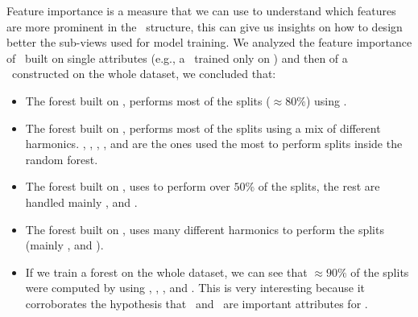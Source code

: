 Feature importance is a measure that we can use to understand which features are more prominent in
the \rf\ structure, this can give us insights on how to design better the sub-views used for model
training. We analyzed the feature importance of \rfs\ built on single attributes (e.g., a \rf\
trained only on \an) and then of a \rf\ constructed on the whole dataset, we concluded that:
\begin{itemize}
	\item The forest built on \an, performs most of the splits ($\approx 80\%$) using \an[2].
	\item The forest built on \bn, performs most of the splits using a mix of different
	      harmonics. \bn[6], \bn[9], \bn[3], \bn[14], \bn[7] and \bn[5] are the ones used the most to perform splits inside the random forest.
	\item The forest built on \cnmod, uses \cnmod[2] to perform over $50\%$ of the splits, the rest are handled mainly \cnmod[5], \cnmod[9] and \cnmod[13].
	\item The forest built on \phin, uses many different harmonics to perform the splits (mainly
	      \phin[10], \phin[12] and \phin[6]).
	\item If we train a forest on the whole dataset, we can see that $\approx90\%$ of the splits
	      were computed by using \cnmod[2], \cnmod[3], \an[12], \an[2] and \an[14]. This is very
	      interesting because it corroborates the hypothesis that \cnmod\ and \an\ are
	      important attributes for \qrp.
\end{itemize}

